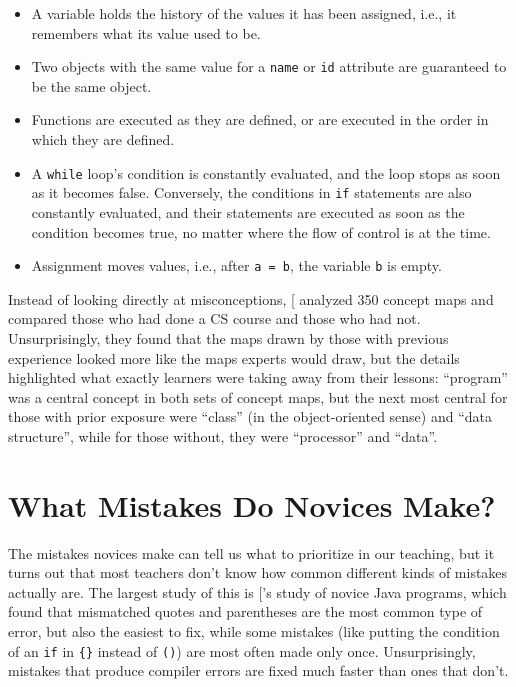 \begin{itemize}
\item
  A variable holds the history of the values it has been assigned,
  i.e., it remembers what its value used to be.
\item
  Two objects with the same value for a \texttt{name} or \texttt{id} attribute are
  guaranteed to be the same object.
\item
  Functions are executed as they are defined, or are executed in the
  order in which they are defined.
\item
  A \texttt{while} loop's condition is constantly evaluated, and the loop
  stops as soon as it becomes false. Conversely, the conditions in
  \texttt{if} statements are also constantly evaluated, and their statements
  are executed as soon as the condition becomes true, no matter where
  the flow of control is at the time.
\item
  Assignment moves values, i.e., after \texttt{a\ =\ b}, the variable \texttt{b} is
  empty.
\end{itemize}

Instead of looking directly at misconceptions, {[}\protect[\hyperlink{b:Muhl2016}{Muhl2016}]{]}
analyzed 350 concept maps and compared those who had done a CS course
and those who had not. Unsurprisingly, they found that the maps drawn by
those with previous experience looked more like the maps experts would
draw, but the details highlighted what exactly learners were taking away
from their lessons: ``program'' was a central concept in both sets of
concept maps, but the next most central for those with prior exposure
were ``class'' (in the object-oriented sense) and ``data structure'', while
for those without, they were ``processor'' and ``data''.

\section{What Mistakes Do Novices Make?}\label{s:pck-mistakes}

The mistakes novices make can tell us what to prioritize in our
teaching, but it turns out that most teachers don't know how common
different kinds of mistakes actually are. The largest study of this is
{[}\protect[\hyperlink{b:Brow2017}{Brow2017}]{]}'s study of novice Java programs, which found that
mismatched quotes and parentheses are the most common type of error, but
also the easiest to fix, while some mistakes (like putting the condition
of an \texttt{if} in \texttt{\{\}} instead of \texttt{()}) are most often made only once.
Unsurprisingly, mistakes that produce compiler errors are fixed much
faster than ones that don't.

